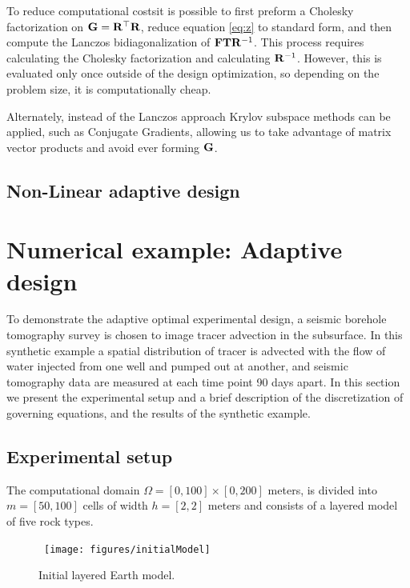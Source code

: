 \documentclass[12pt]{article}
\newcommand{\bfF}	{{\bf{F}}}
\newcommand{\bfG}	{{\bf{G}}}
\newcommand{\bfR}	{{\bf{R}}}
\newcommand{\bfT}	{{\bf{T}}}
\begin{document}
To reduce computational costsit is possible to first preform a Cholesky factorization on $\bfG = \bfR^{\top}\bfR$, reduce equation \eqref{eq:z} to standard form, and then compute the  Lanczos bidiagonalization of $\bfF \bfT \bfR^{-1}$. This process requires calculating the Cholesky factorization and  calculating $\bfR^{-1}$. However, this  is evaluated only once outside of the design optimization, so depending on the problem size, it is computationally cheap. 

Alternately, instead of the Lanczos approach Krylov subspace methods can be applied, such as  Conjugate Gradients, allowing us to take advantage of matrix vector products and avoid ever forming $\bfG$. 
\subsection{Non-Linear adaptive design}
 
 
 \newpage
\section{Numerical example: Adaptive design} %
To demonstrate  the adaptive optimal experimental design, a seismic borehole tomography survey is chosen to image tracer advection in the subsurface. 
In this synthetic example a spatial distribution of  tracer is advected with the flow of water injected from one well and pumped out at another, and seismic tomography data are measured  at each time point 90 days apart. 
In this section we present the experimental setup and a brief description of the discretization of governing equations, and the results of the synthetic example.

\subsection{Experimental setup}
The computational domain $\Omega=[0, 100] \times [0, 200]$ meters, is divided into $m=[50, 100]$ cells of width $h=[2,2]$ meters and consists of a layered model of five rock types.
%
%
\begin{figure}[h!]
\begin{center}
\	\texttt{[image: figures/initialModel]}
\end{center}
\caption{Initial layered Earth model.}
\end{figure}
\end{document}
